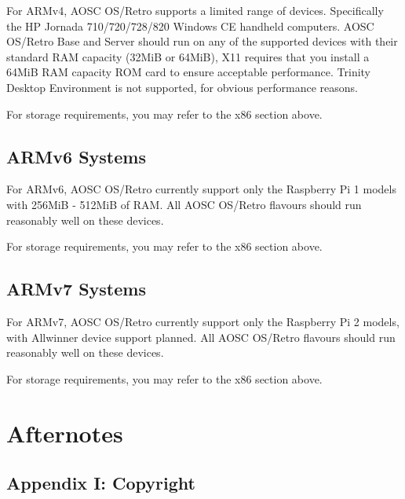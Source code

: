     For ARMv4, AOSC OS/Retro supports a limited range of devices.
    Specifically the HP Jornada 710/720/728/820 Windows CE handheld computers.
    AOSC OS/Retro Base and Server should run on any of the supported devices with their standard RAM capacity (32MiB or 64MiB),
    X11 requires that you install a 64MiB RAM capacity ROM card to ensure acceptable performance.
    Trinity Desktop Environment is not supported, for obvious performance reasons.

    For storage requirements, you may refer to the x86 section above.

    \section{ARMv6 Systems}

    For ARMv6, AOSC OS/Retro currently support only the Raspberry Pi 1 models
    with 256MiB - 512MiB of RAM. All AOSC OS/Retro flavours should run reasonably well on these devices.

    For storage requirements, you may refer to the x86 section above.

    \section{ARMv7 Systems}

    For ARMv7, AOSC OS/Retro currently support only the Raspberry Pi 2 models,
    with Allwinner device support planned.
    All AOSC OS/Retro flavours should run reasonably well on these devices.

    For storage requirements, you may refer to the x86 section above.







    \chapter{Afternotes}
    
    \section{Appendix I: Copyright}

